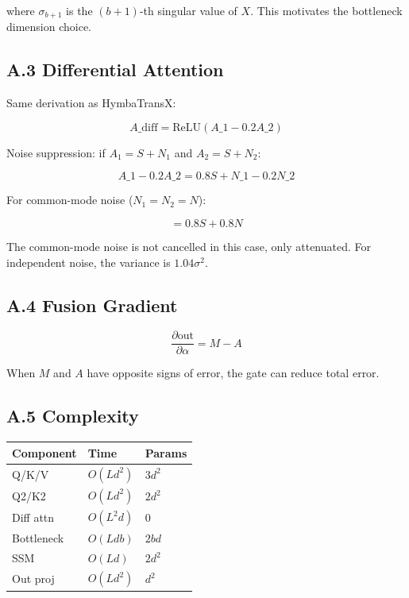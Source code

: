 where $\sigma_{b+1}$ is the $(b+1)$-th singular value of $X$. This 
motivates the bottleneck dimension choice.

\subsection{A.3 Differential Attention}

Same derivation as HymbaTransX:

\[
A\_\text{diff} = \text{ReLU}(A\_1 - 0.2 A\_2)
\tag{A.4}
\]

Noise suppression: if $A_1 = S + N_1$ and $A_2 = S + N_2$:

\[
A\_1 - 0.2 A\_2 = 0.8 S + N\_1 - 0.2 N\_2
\tag{A.5}
\]

For common-mode noise ($N_1 = N_2 = N$):

\[
= 0.8 S + 0.8 N
\tag{A.6}
\]

The common-mode noise is not cancelled in this case, only attenuated. For 
independent noise, the variance is $1.04 \sigma^2$.

\subsection{A.4 Fusion Gradient}

\[
\frac{\partial \text{out}}{\partial \alpha} = M - A
\tag{A.7}
\]

When $M$ and $A$ have opposite signs of error, the gate can reduce total 
error.

\subsection{A.5 Complexity}

\begin{table}[H]
\centering
\small
\begin{tabular}{lll}
\toprule
\textbf{Component} & \textbf{Time} & \textbf{Params} \\
\midrule
Q/K/V & $O(L d^2)$ & $3 d^2$ \\
Q2/K2 & $O(L d^2)$ & $2 d^2$ \\
Diff attn & $O(L^2 d)$ & 0 \\
Bottleneck & $O(L d b)$ & $2 b d$ \\
SSM & $O(L d)$ & $2 d^2$ \\
Out proj & $O(L d^2)$ & $d^2$ \\
\bottomrule
\end{tabular}
\end{table}

